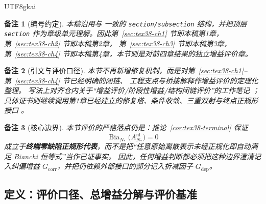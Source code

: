 \documentclass[12pt]{article}
\newtheorem{remark}{备注}[section]
\newcommand{\code}[1]{\path{#1}}
\newcommand{\Bia}{\operatorname{Bia}}
\begin{document}
\begin{CJK*}{UTF8}{gkai}
\begin{remark}[编号约定]
本稿沿用与 \code{tex37} 一致的 \texttt{section/subsection} 结构，并把顶层 \texttt{section}
作为章级单元理解。因此第~\ref{sec:tex38-ch1} 节即本稿第1章，
第~\ref{sec:tex38-ch2} 节即本稿第2章，
第~\ref{sec:tex38-ch3} 节即本稿第3章，
第~\ref{sec:tex38-ch4} 节即本稿第4章，本节则是对前四章结果的独立增益评价章。
\end{remark}

\begin{remark}[引文与评价口径]
本节不再新增修复机制，而是对第~\ref{sec:tex38-ch1}--第~\ref{sec:tex38-ch4} 节已经明确的闭链、
工程支点与桥接解释作增益评价的定理化整理。
写法上对齐仓内关于“增益评价/阶段性增益/结构闭链评价”的工作笔记
\cite{RepoTex37GainEvaluation,RepoTex28StageGains,RepoTex22DiscussionGains}；
具体证书则继续调用第1章已经建立的修复塔、条件收敛、三重双射与终点正规形接口
\cite{RepoTex31RepairTower,RepoTex32ConditionalConvergence,RepoTex36HomotopyTwistBijection,RepoTex6JacobiGap,
  GaoZheng2025GFramework,GaoZhengAppVol3}。
\end{remark}

\begin{remark}[核心边界]
本节评价的严格落点仍是：推论~\ref{cor:tex38-terminal} 保证
\[
  \Bia_{N_\ast}\bigl(A_{N_\ast}^{\mathrm{nf}}\bigr)=0
\]
成立于\textbf{终端零缺陷正规形代表}，而不是把“任意原始离散表示未经正规化即自动满足 Bianchi 恒等式”当作已证事实。
因此，任何增益判断都必须把这种边界澄清记入纠偏增益 $G_{\mathrm{corr}}$，并把仍依赖外部接口的部分记入折减因子 $G_{\mathrm{dep}}$。
\end{remark}

\subsection{定义：评价口径、总增益分解与评价基准}
\label{subsec:tex38-gain-definition}


\end{CJK*}
\end{document}
